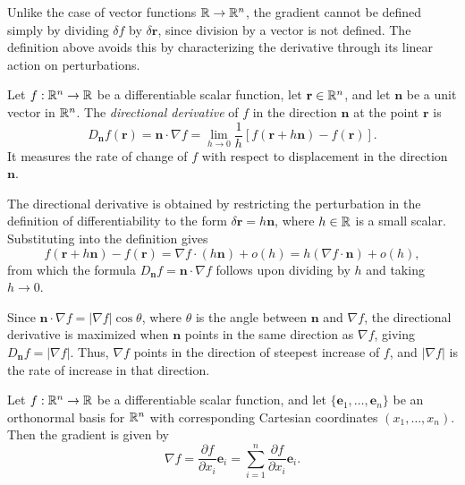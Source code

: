 \documentclass[a4paper]{article}
\begin{document}
\begin{rmk}
  Unlike the case of vector functions $\mathbb{R} \to \mathbb{R}^n$, the gradient cannot be defined simply by dividing $\delta f$ by $\delta \mathbf{r}$, since division by a vector is not defined. The definition above avoids this by characterizing the derivative through its linear action on perturbations.
\end{rmk}

\begin{defi}
  Let $f: \mathbb{R}^n \to \mathbb{R}$ be a differentiable scalar function, let $\mathbf{r} \in \mathbb{R}^n$, and let $\mathbf{n}$ be a unit vector in $\mathbb{R}^n$. The \emph{directional derivative} of $f$ in the direction $\mathbf{n}$ at the point $\mathbf{r}$ is
  \[
    D_{\mathbf{n}} f(\mathbf{r}) = \mathbf{n}\cdot \nabla f = \lim_{h \to 0} \frac{1}{h}[f(\mathbf{r} + h\mathbf{n}) - f(\mathbf{r})].
  \]
  It measures the rate of change of $f$ with respect to displacement in the direction $\mathbf{n}$.
\end{defi}

\begin{rmk}
  The directional derivative is obtained by restricting the perturbation in the definition of differentiability to the form $\delta \mathbf{r} = h\mathbf{n}$, where $h \in \mathbb{R}$ is a small scalar. Substituting into the definition gives
  \[
    f(\mathbf{r} + h\mathbf{n}) - f(\mathbf{r}) = \nabla f \cdot (h\mathbf{n}) + o(h) = h(\nabla f\cdot \mathbf{n}) + o(h),
  \]
  from which the formula $D_{\mathbf{n}} f = \mathbf{n} \cdot \nabla f$ follows upon dividing by $h$ and taking $h \to 0$.
\end{rmk}

\begin{rmk}
  Since $\mathbf{n} \cdot \nabla f = |\nabla f| \cos \theta$, where $\theta$ is the angle between $\mathbf{n}$ and $\nabla f$, the directional derivative is maximized when $\mathbf{n}$ points in the same direction as $\nabla f$, giving $D_{\mathbf{n}} f = |\nabla f|$. Thus, $\nabla f$ points in the direction of steepest increase of $f$, and $|\nabla f|$ is the rate of increase in that direction.
\end{rmk}

\begin{thm}
  Let $f: \mathbb{R}^n \to \mathbb{R}$ be a differentiable scalar function, and let $\{\mathbf{e}_1, \ldots, \mathbf{e}_n\}$ be an orthonormal basis for $\mathbb{R}^n$ with corresponding Cartesian coordinates $(x_1, \ldots, x_n)$. Then the gradient is given by
  \[
    \nabla f = \frac{\partial f}{\partial x_i}\mathbf{e}_i = \sum_{i=1}^{n} \frac{\partial f}{\partial x_i}\mathbf{e}_i.
  \]
\end{thm}
\end{document}
